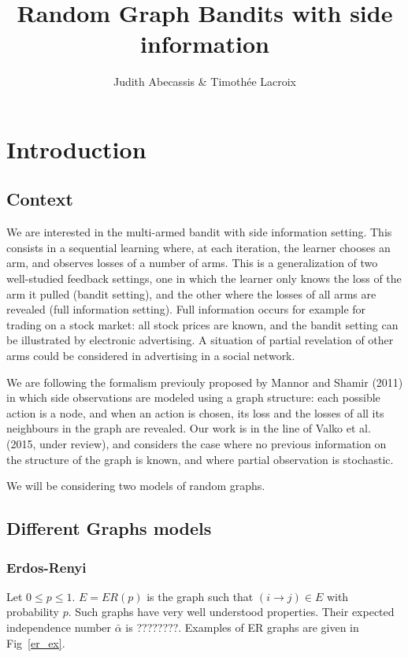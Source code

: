 \documentclass[10pt,a4paper]{scrartcl}
\author{Judith Abecassis \& Timothée Lacroix}
\title{Random Graph Bandits with side information}
\begin{document}
\maketitle

\section{Introduction}
\subsection{Context}
We are interested in the multi-armed bandit with side information setting. This consists in a sequential learning where, at each iteration, the learner chooses an arm, and observes losses of a number of arms. This is a generalization of two well-studied feedback settings, one in which the learner only knows the loss of the arm it pulled (bandit setting), and the other where the losses of all arms are revealed (full information setting). Full information occurs for example for trading on a stock market: all stock prices are known, and the bandit setting can be illustrated by electronic advertising. A situation of partial revelation of other arms could be considered in advertising in a social network.

We are following the formalism previouly proposed by Mannor and Shamir (2011) in which side observations are modeled using a graph structure: each possible action is a node, and when an action is chosen, its loss and the losses of all its neighbours in the graph are revealed. Our work is in the line of Valko et al. (2015, under review), and considers the case where no previous information on the structure of the graph is known, and where partial observation is stochastic. 

We will be considering two models of random graphs.

\subsection{Different Graphs models}

\subsubsection{Erdos-Renyi}
Let $0\leq p \leq 1$. $E=ER(p)$ is the graph such that $(i \rightarrow j) \in E$ with probability $p$. Such graphs have very well understood properties. Their expected independence number $\bar{\alpha}$ is ????????.
Examples of ER graphs are given in Fig~\ref{er_ex}.
\end{document}

